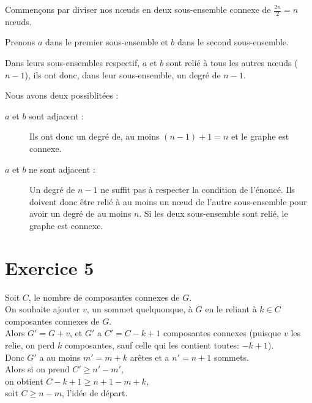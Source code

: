 \documentclass[fontsize=10pt]{article}
\begin{document}
Commençons par diviser nos nœuds en deux sous-ensemble connexe de
$\frac{2n}{2} = n$ nœuds.

Prenons $a$ dans le premier sous-ensemble et $b$
dans le second sous-ensemble.

Dans leurs sous-ensembles respectif, $a$ et $b$
sont relié à tous les autres nœuds ($n-1$), ils ont donc, dans leur sous-ensemble, un
degré de $n - 1$.

Nous avons deux possiblitées :
\begin{description}
    \item [$a$ et $b$ sont adjacent :]
        Ils ont donc un degré de, au moins $(n - 1) + 1 = n$ et le graphe est
        connexe.  \item [$a$ et $b$ ne sont adjacent :] Un degré de $n-1$ ne suffit pas à respecter la condition de l'énoncé.  Ils doivent donc être relié à au moins un nœud de l'autre sous-ensemble
        pour avoir un degré de au moins $n$. Si les deux sous-ensemble sont
        relié, le graphe est connexe.
\end{description}

\section*{Exercice 5}
Soit $C$, le nombre de composantes connexes de $G$.\\
On souhaite ajouter $v$, un sommet quelquonque, à $G$ en le reliant à $k\in{C}$ composantes connexes de $G$.\\
Alors $G' = G + v$, et $G'$ a $C'=C-k+1$ composantes connexes (puisque $v$ les relie, on perd $k$ composantes, sauf celle qui les contient toutes: $-k+1$).\\
Donc $G'$ a au moins $m'= m+k$ arêtes et a $n'=n+1$ sommets.\\
Alors si on prend $C'\geq n'- m'$,\\
on obtient $C-k+1 \geq n+1 - m+k$,\\
soit $C \geq n-m$, l'idée de départ.
\end{document}
